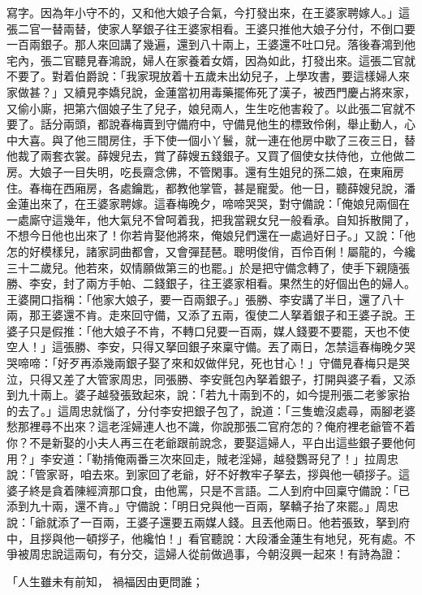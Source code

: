 寫字。因為年小守不的，又和他大娘子合氣，今打發出來，在王婆家聘嫁人。」這張二官一替兩替，使家人拏銀子往王婆家相看。王婆只推他大娘子分付，不倒口要一百兩銀子。那人來回講了幾遍，還到八十兩上，王婆還不吐口兒。落後春鴻到他宅內，張二官聽見春鴻說，婦人在家養着女婿，因為如此，打發出來。這張二官就不要了。對着伯爵說：「我家現放着十五歲未出幼兒子，上學攻書，要這樣婦人來家做甚？」又續見李嬌兒說，金蓮當初用毒藥擺佈死了漢子，被西門慶占將來家，又偷小廝，把第六個娘子生了兒子，娘兒兩人，生生吃他害殺了。以此張二官就不要了。話分兩頭，都說春梅賣到守備府中，守備見他生的標致伶俐，舉止動人，心中大喜。與了他三間房住，手下使一個小丫鬟，就一連在他房中歇了三夜三日，替他裁了兩套衣裳。薛嫂兒去，賞了薛嫂五錢銀子。又買了個使女扶侍他，立他做二房。大娘子一目失明，吃長齋念佛，不管閑事。還有生姐兒的孫二娘，在東廂房住。春梅在西廂房，各處鑰匙，都教他掌管，甚是寵愛。他一日，聽薛嫂兒說，潘金蓮出來了，在王婆家聘嫁。這春梅晚夕，啼啼哭哭，對守備說：「俺娘兒兩個在一處廝守這幾年，他大氣兒不曾呵着我，把我當親女兒一般看承。自知拆散開了，不想今日他也出來了！你若肯娶他將來，俺娘兒們還在一處過好日子。」又說：「他怎的好模樣兒，諸家詞曲都會，又會彈琵琶。聰明俊俏，百伶百俐！屬龍的，今纔三十二歲兒。他若來，奴情願做第三的也罷。」於是把守備念轉了，使手下親隨張勝、李安，封了兩方手帕、二錢銀子，往王婆家相看。果然生的好個出色的婦人。王婆開口指稱：「他家大娘子，要一百兩銀子。」張勝、李安講了半日，還了八十兩，那王婆還不肯。走來回守備，又添了五兩，復使二人拏着銀子和王婆子說。王婆子只是假推：「他大娘子不肯，不轉口兒要一百兩，媒人錢要不要罷，天也不使空人！」這張勝、李安，只得又拏回銀子來稟守備。丟了兩日，怎禁這春梅晚夕哭哭啼啼：「好歹再添幾兩銀子娶了來和奴做伴兒，死也甘心！」守備見春梅只是哭泣，只得又差了大管家周忠，同張勝、李安氈包內拏着銀子，打開與婆子看，又添到九十兩上。婆子越發張致起來，說：「若九十兩到不的，如今提刑張二老爹家抬的去了。」這周忠就惱了，分付李安把銀子包了，說道：「三隻蟾沒處尋，兩腳老婆愁那裡尋不出來？這老淫婦連人也不識，你說那張二官府怎的？俺府裡老爺管不着你？不是新娶的小夫人再三在老爺跟前說念，要娶這婦人，平白出這些銀子要他何用？」李安道：「勒掯俺兩番三次來回走，賊老淫婦，越發鸚哥兒了！」拉周忠說：「管家哥，咱去來。到家回了老爺，好不好教牢子拏去，拶與他一頓拶子。這婆子終是貪着陳經濟那口食，由他罵，只是不言語。二人到府中回稟守備說：「已添到九十兩，還不肯。」守備說：「明日兌與他一百兩，拏轎子抬了來罷。」周忠說：「爺就添了一百兩，王婆子還要五兩媒人錢。且丟他兩日。他若張致，拏到府中，且拶與他一頓拶子，他纔怕！」看官聽說：大段潘金蓮生有地兒，死有處。不爭被周忠說這兩句，有分交，這婦人從前做過事，今朝沒興一起來！有詩為證：

「人生雖未有前知，  禍福因由更問誰；

